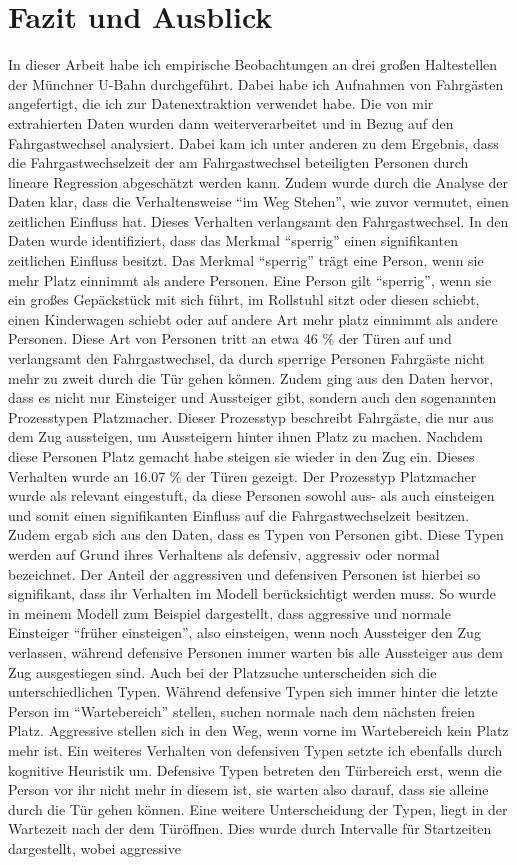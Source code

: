 \chapter{Fazit und Ausblick} \label{Fazit und Ausblick}
In dieser Arbeit habe ich empirische Beobachtungen an drei großen Haltestellen der Münchner U-Bahn durchgeführt. Dabei habe ich Aufnahmen von Fahrgästen angefertigt, die ich zur Datenextraktion verwendet habe. Die von mir extrahierten Daten wurden dann weiterverarbeitet und in Bezug auf den Fahrgastwechsel analysiert. Dabei kam ich unter anderen zu dem Ergebnis, dass die Fahrgastwechselzeit der am Fahrgastwechsel beteiligten Personen durch lineare Regression abgeschätzt werden kann. Zudem wurde durch die Analyse der Daten klar, dass die Verhaltensweise "`im Weg Stehen"', wie zuvor vermutet, einen zeitlichen Einfluss hat. Dieses Verhalten verlangsamt den Fahrgastwechsel. In den Daten wurde identifiziert, dass das Merkmal "`sperrig"' einen signifikanten zeitlichen Einfluss besitzt. Das Merkmal "`sperrig"' trägt eine Person, wenn sie mehr Platz einnimmt als andere Personen. Eine Person gilt "`sperrig"', wenn sie ein großes Gepäckstück mit sich führt, im Rollstuhl sitzt oder diesen schiebt, einen Kinderwagen schiebt oder auf andere Art mehr platz einnimmt als andere Personen. Diese Art von Personen tritt an etwa 46 \% der Türen auf und verlangsamt den Fahrgastwechsel, da durch sperrige Personen Fahrgäste nicht mehr zu zweit durch die Tür gehen können. Zudem ging aus den Daten hervor, dass es nicht nur Einsteiger und Aussteiger gibt, sondern auch den sogenannten Prozesstypen Platzmacher. Dieser Prozesstyp beschreibt Fahrgäste, die nur aus dem Zug aussteigen, um Aussteigern hinter ihnen Platz zu machen. Nachdem diese Personen Platz gemacht habe steigen sie wieder in den Zug ein. Dieses Verhalten wurde an 16.07 \% der Türen gezeigt. Der Prozesstyp Platzmacher wurde als relevant eingestuft, da diese Personen sowohl aus- als auch einsteigen und somit einen signifikanten Einfluss auf die Fahrgastwechselzeit besitzen. Zudem ergab sich aus den Daten, dass es Typen von Personen gibt. Diese Typen werden auf Grund ihres Verhaltens als defensiv, aggressiv oder normal bezeichnet. Der Anteil der aggressiven und defensiven Personen ist hierbei so signifikant, dass ihr Verhalten im Modell berücksichtigt werden muss. So wurde in meinem Modell zum Beispiel dargestellt, dass aggressive und normale Einsteiger "`früher einsteigen"', also einsteigen, wenn noch Aussteiger den Zug verlassen, während defensive Personen immer warten bis alle Aussteiger aus dem Zug ausgestiegen sind. Auch bei der Platzsuche unterscheiden sich die unterschiedlichen Typen. Während defensive Typen sich immer hinter die letzte Person im "`Wartebereich"' stellen, suchen normale nach dem nächsten freien Platz. Aggressive stellen sich in den Weg, wenn vorne im Wartebereich kein Platz mehr ist. Ein weiteres Verhalten von defensiven Typen setzte ich ebenfalls durch kognitive Heuristik um. Defensive Typen betreten den Türbereich erst, wenn die Person vor ihr nicht mehr in diesem ist, sie warten also darauf, dass sie alleine durch die Tür gehen können. Eine weitere Unterscheidung der Typen, liegt in der Wartezeit nach der dem Türöffnen. Dies wurde durch Intervalle für Startzeiten dargestellt, wobei aggressive 
